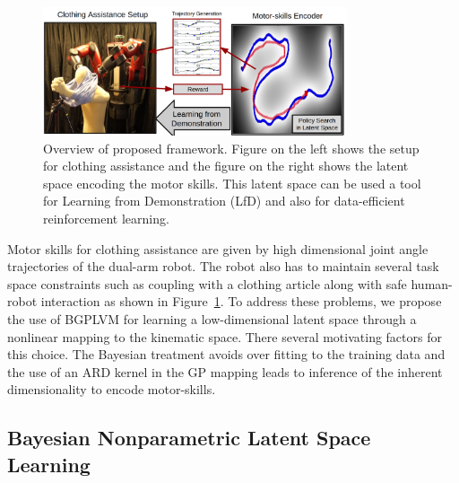 \documentclass{article}
\begin{document}
\begin{figure}
  \centering
  \includegraphics[width=0.8\textwidth]{overview.png}
  \caption{Overview of proposed framework. Figure on the left shows the setup for clothing assistance and the figure on the right shows the latent space encoding the motor skills. This latent space can be used a tool for Learning from Demonstration (LfD) and also for data-efficient reinforcement learning.}
  \label{figure:overview}
\end{figure}
Motor skills for clothing assistance are given by high dimensional joint angle trajectories of the dual-arm robot. The robot also has to maintain several task space constraints such as coupling with a clothing article along with safe human-robot interaction as shown in Figure~\ref{figure:overview}. To address these problems, we propose the use of BGPLVM for learning a low-dimensional latent space through a nonlinear mapping to the kinematic space. There several motivating factors for this choice. The Bayesian treatment avoids over fitting to the training data and the use of an ARD kernel in the GP mapping leads to inference of the inherent dimensionality to encode motor-skills.

\subsection{Bayesian Nonparametric Latent Space Learning}
\label{section:bgplvm}
\end{document}
